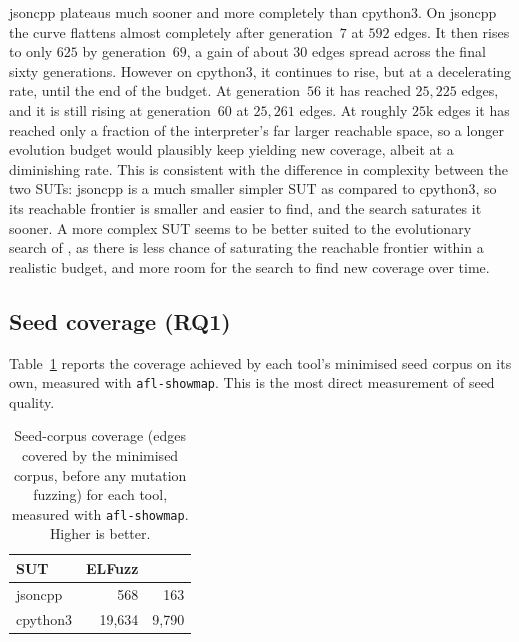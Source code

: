 jsoncpp plateaus much sooner and more completely than cpython3. On jsoncpp the curve flattens almost completely after generation~$7$ at $592$ edges. It then rises to only $625$ by generation~$69$, a gain of about $30$ edges spread across the final sixty generations. However on cpython3, it continues to rise, but at a decelerating rate, until the end of the budget.
At generation~$56$ it has reached $25{,}225$ edges, and it is still rising at generation~$60$ at $25{,}261$ edges. At roughly $25$k edges it has reached only a fraction of the interpreter's far larger reachable space, so a longer evolution budget would plausibly keep yielding new coverage, albeit at a diminishing rate. This is consistent with the difference in complexity between the two SUTs: jsoncpp is a much smaller simpler SUT as compared to cpython3, so its reachable frontier is smaller and easier to find, and the search saturates it sooner. A more complex SUT seems to be better suited to the evolutionary search of \toolname{}, as there is less chance of saturating the reachable frontier within a realistic budget, and more room for the search to find new coverage over time.

\subsection{Seed coverage (RQ1)}
\label{sec:eval-rq1}

Table~\ref{tab:seedcov} reports the coverage achieved by each tool's minimised seed corpus on its own, measured with \texttt{afl-showmap}. This is the most direct measurement of seed quality.

\begin{table}[h]
    \centering
    \begin{tabular}{lrr}
        \toprule
        \textbf{SUT} & \textbf{ELFuzz} & \textbf{\toolname{}} \\
        \midrule
        jsoncpp  & 568    & 163   \\
        cpython3 & 19{,}634 & 9{,}790 \\
        \bottomrule
    \end{tabular}
    \caption{Seed-corpus coverage (edges covered by the minimised corpus, before any mutation fuzzing) for each tool, measured with \texttt{afl-showmap}. Higher is better.}
    \label{tab:seedcov}
\end{table}

